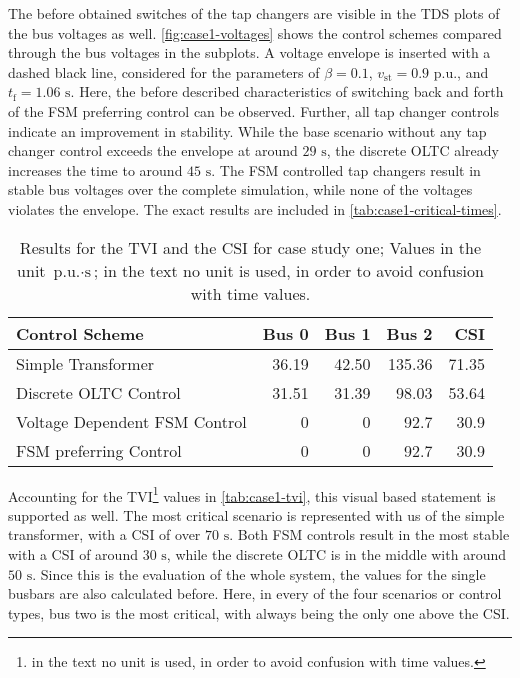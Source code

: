 The before obtained switches of the tap changers are visible in the \acs{TDS} plots of the bus voltages as well.
\autoref{fig:case1-voltages} shows the control schemes compared through the bus voltages in the subplots.
A voltage envelope is inserted with a dashed black line, considered for the parameters of $\beta=0.1$,  $v_\mathrm{st}=0.9\text{ p.u.}$, and $t_\mathrm{f}=1.06\text{ s}$.
Here, the before described characteristics of switching back and forth of the \acs{FSM} preferring control can be observed.
Further, all tap changer controls indicate an improvement in stability.
While the base scenario without any tap changer control exceeds the envelope at around $29\text{ s}$, the discrete \acs{OLTC} already increases the time to around $45\text{ s}$. 
The \acs{FSM} controlled tap changers result in stable bus voltages over the complete simulation, while none of the voltages violates the envelope.
The exact results are included in \autoref{tab:case1-critical-times}.

\begin{table}[htbp!]
    \caption[Results for the \acs{TVI} and the \acs{CSI} for case study one]{Results for the \acs{TVI} and the \acs{CSI} for case study one; Values in the unit $\text{p.u.} \cdot \text{s}$; in the text no unit is used, in order to avoid confusion with time values.}
    \label{tab:case1-tvi}
    \vspace*{12pt}
    \centering
    \small
    \begin{tabularx}{\textwidth}{Xrrrr}
        \textbf{Control Scheme} & \textbf{Bus 0} & \textbf{Bus 1} & \textbf{Bus 2} & \textbf{\acs{CSI}} \\ \hline
        \toprule
        Simple Transformer                  & 36.19 & 42.50 & 135.36 & 71.35 \\
        Discrete \acs{OLTC} Control         & 31.51 & 31.39 & 98.03 & 53.64 \\
        Voltage Dependent \acs{FSM} Control & 0 & 0 & 92.7 & 30.9 \\
        \acs{FSM} preferring Control        & 0 & 0 & 92.7 & 30.9 \\
        \bottomrule
    \end{tabularx}
\end{table}

Accounting for the \acs{TVI}\footnote{in the text no unit is used, in order to avoid confusion with time values.} values in \autoref{tab:case1-tvi}, this visual based statement is supported as well.
The most critical scenario is represented with us of the simple transformer, with a \acs{CSI} of over $70\text{ s}$.
Both \acs{FSM} controls result in the most stable with a \acs{CSI} of around $30\text{ s}$, while the discrete \acs{OLTC} is in the middle with around $50\text{ s}$.
Since this is the evaluation of the whole system, the values for the single busbars are also calculated before.
Here, in every of the four scenarios or control types, bus two is the most critical, with always being the only one above the \acs{CSI}.

